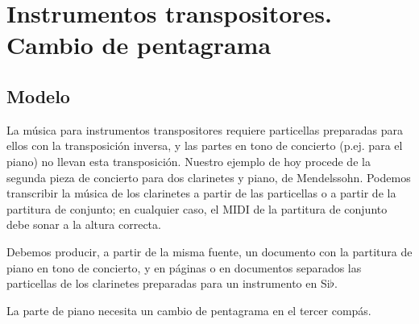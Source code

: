 
\section{Instrumentos transpositores. Cambio de pentagrama}


\subsection{Modelo}

La música para instrumentos transpositores requiere particellas
preparadas para ellos con la transposición inversa, y las partes en
tono de concierto (p.ej. para el piano) no llevan esta transposición.
Nuestro ejemplo de hoy procede de la segunda pieza de concierto para
dos clarinetes y piano, de Mendelssohn.  Podemos transcribir la música
de los clarinetes a partir de las particellas o a partir de la
partitura de conjunto; en cualquier caso, el MIDI de la partitura de
conjunto debe sonar a la altura correcta.

Debemos producir, a partir de la misma fuente, un documento con la
partitura de piano en tono de concierto, y en páginas o en documentos
separados las particellas de los clarinetes preparadas para un
instrumento en Si$\flat$.

La parte de piano necesita un cambio de pentagrama en el tercer
compás.

